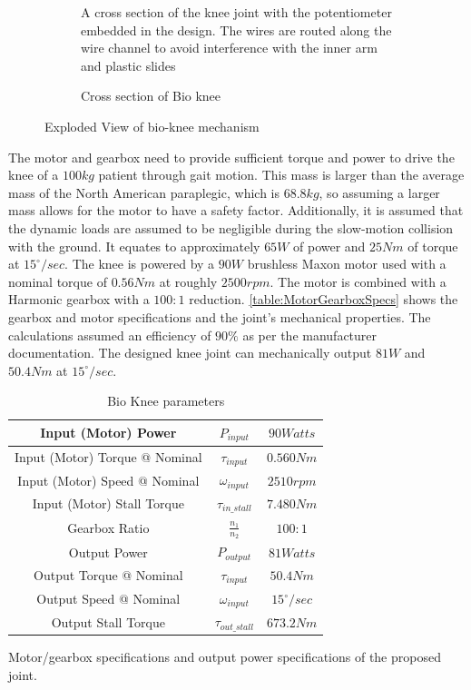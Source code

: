 \begin{figure}
\begin{subfigure}{\textwidth}
          \captionsetup{justification=centering}
        \caption{Cross section of Bio knee}{A cross section of the knee joint with the potentiometer embedded in the design. The wires are routed along the wire channel to avoid interference with the inner arm and plastic slides}
        \label{fig:CrossSectionPot}
    \end{subfigure}    
    \caption{Exploded View of bio-knee mechanism}
    \label{fig:bioknee}
\end{figure}

The motor and gearbox need to provide sufficient torque and power to drive the knee of a $100kg$ patient through gait motion. This mass is larger than the average mass of the North American paraplegic, which is $68.8kg$, so assuming a larger mass allows for the motor to have a safety factor. Additionally, it is assumed that the dynamic loads are assumed to be negligible during the slow-motion collision with the ground. It equates to approximately $65W$ of power and $25Nm$ of torque at \(15^\circ/sec\). The knee is powered by a $90W$ brushless Maxon motor used with a nominal torque of $0.56Nm$ at roughly $2500rpm$.  The motor is combined with a Harmonic gearbox with a $100:1$ reduction. \autoref{table:MotorGearboxSpecs} shows the gearbox and motor specifications and the joint's mechanical properties. The calculations assumed an efficiency of \(90\%\) as per the manufacturer documentation. The designed knee joint can mechanically output $81W$ and $50.4Nm$ at $15^\circ/sec$.  

\begin{table}
    \centering
    \begin{tabular}{||c|c|c||}
        \hline
        Input (Motor) Power & \(P_{input}\) & \(90 Watts\) \\
        \hline
        Input (Motor) Torque @ Nominal & \(\tau_{input}\) & \(0.560 Nm\) \\
        \hline
        Input (Motor) Speed @ Nominal & \(\omega_{input}\) & \(2510 rpm\) \\
        \hline
        Input (Motor) Stall Torque & \(\tau_{in\_stall}\) & \(7.480 Nm\) \\
        \hline \hline
        Gearbox Ratio & \(\frac{n_1}{n_2}\) & \(100:1\) \\
        \hline \hline
        Output Power & \(P_{output}\) & \(81 Watts\) \\
        \hline
        Output Torque @ Nominal & \(\tau_{input}\) & \(50.4 Nm\) \\
        \hline
        Output Speed @ Nominal & \(\omega_{input}\) & \(15^\circ/sec\) \\
        \hline
        Output Stall Torque & \(\tau_{out\_stall}\) & \(673.2 Nm\) \\
        \hline
    \end{tabular}
    \caption{Bio Knee parameters}{Motor/gearbox specifications and output power specifications of the proposed joint.}
    \label{table:MotorGearboxSpecs}
\end{table}

